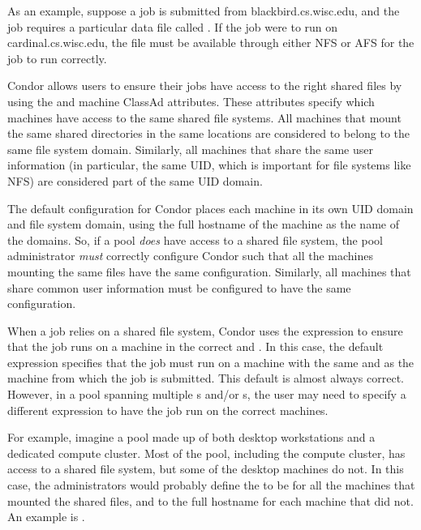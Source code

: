 As an example, suppose a job is submitted from blackbird.cs.wisc.edu,
and the job requires a particular data file called
.  If the job were to run on
cardinal.cs.wisc.edu, the file  must be
available through either NFS or AFS for the job to run correctly.

Condor allows users to ensure their jobs have access to the right
shared files by using the  and
 machine ClassAd attributes.
These attributes specify which machines have access to the same shared
file systems.
All machines that mount the same shared directories in the same
locations are considered to belong to the same file system domain.
Similarly, all machines that share the same user information (in
particular, the same UID, which is important for file systems like
NFS) are considered part of the same UID domain.

The default configuration for Condor places each machine
in its own UID domain and file system domain, using the full hostname of the
machine as the name of the domains.
So, if a pool \emph{does} have access to a shared file system,
the pool administrator \emph{must} correctly configure Condor 
such that all
the machines mounting the same files have the same
 configuration.
Similarly, all machines that share common user information must be
configured to have the same  configuration.

When a job relies on a shared file system,
Condor uses the
 expression to ensure that the job runs
on a machine in the
correct  and .
In this case, the default  expression specifies
that the job must run on a machine with the same 
and  as the machine from which the job
is submitted.
This default is almost always correct.
However, in a pool spanning multiple s and/or
s, the user may need to specify a different
 expression to have the job run on the correct
machines.

For example, imagine a pool made up of both desktop workstations and a
dedicated compute cluster.
Most of the pool, including the compute cluster, has access to a
shared file system, but some of the desktop machines do not.
In this case, the administrators would probably define the
 to be  for all the machines
that mounted the shared files, and to the full hostname for each
machine that did not. An example is .

